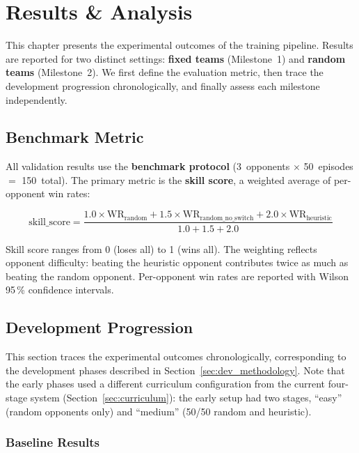 \chapter{Results \& Analysis}
\label{ch:results}

This chapter presents the experimental outcomes of the training pipeline.
Results are reported for two distinct settings: \textbf{fixed teams}
(Milestone~1) and \textbf{random teams} (Milestone~2).  We first define the
evaluation metric, then trace the development progression chronologically,
and finally assess each milestone independently.

\section{Benchmark Metric}

All validation results use the \textbf{benchmark protocol} (3~opponents
$\times$ 50~episodes $=$ 150~total).  The primary metric is the
\textbf{skill score}, a weighted average of per-opponent win rates:

\[
  \text{skill\_score} = \frac{
    1.0 \times \text{WR}_{\text{random}} +
    1.5 \times \text{WR}_{\text{random\_no\_switch}} +
    2.0 \times \text{WR}_{\text{heuristic}}
  }{1.0 + 1.5 + 2.0}
\]

Skill score ranges from 0 (loses all) to 1 (wins all).  The weighting
reflects opponent difficulty: beating the heuristic opponent contributes
twice as much as beating the random opponent.  Per-opponent win rates are
reported with Wilson 95\,\% confidence intervals.

\section{Development Progression}

This section traces the experimental outcomes chronologically, corresponding
to the development phases described in
Section~\ref{sec:dev_methodology}.  Note that the early phases used a
different curriculum configuration from the current four-stage system
(Section~\ref{sec:curriculum}): the early setup had two stages, ``easy''
(random opponents only) and ``medium'' (50/50 random and heuristic).

\subsection{Baseline Results}

